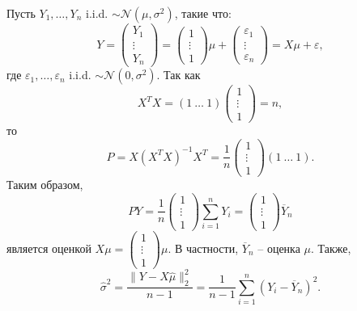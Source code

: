 \begin{exmp}
	Пусть $Y_1, \dots, Y_n$ i.i.d. $\sim \mathcal{N}(\mu, \sigma^2)$, такие что:
	\[ Y = \begin{pmatrix}
	Y_1 \\
	\vdots \\
	Y_n
	\end{pmatrix}
	=
	 \begin{pmatrix}
	 1 \\
	 \vdots \\
	 1
	 \end{pmatrix}
	 \mu +
	  \begin{pmatrix}
	  \varepsilon_1 \\
	  \vdots \\
	  \varepsilon_n
	  \end{pmatrix}
	  = X \mu + \varepsilon,
	  	 \]
	 где $\varepsilon_1, \dots, \varepsilon_n$ i.i.d. $\sim \mathcal{N}(0, \sigma^2)$. Так как
	 \[ X^TX = (1\ \dots\ 1) \begin{pmatrix}
	 1 \\
	 \vdots \\
	 1
	 \end{pmatrix} = n, \]
	 то
	 \[ P = X(X^TX)^{-1}X^T = \frac{1}{n}\begin{pmatrix}
	 1 \\
	 \vdots \\
	 1
	 \end{pmatrix}
	 (1\ \dots\ 1).  \]
	 Таким образом,
	 \[ PY = \frac{1}{n}\begin{pmatrix}
	 1 \\
	 \vdots \\
	 1
	 \end{pmatrix}
	 \sum_{i=1}^n Y_i = \begin{pmatrix}
	 1 \\
	 \vdots \\
	 1
	 \end{pmatrix} \overline{Y}_n \]
	 является оценкой $X\mu = \begin{pmatrix}
	 1 \\
	 \vdots \\
	 1
	 \end{pmatrix} \mu$. В частности, $\overline{Y}_n$ -- оценка $\mu$. Также,
	 \[ \hat{\sigma}^2 = \frac{\| Y - X\hat{\mu} \|_2^2}{n-1} = \frac{1}{n-1} \sum_{i=1}^{n}(Y_i - \overline{Y}_n)^2. \]
\end{exmp}

